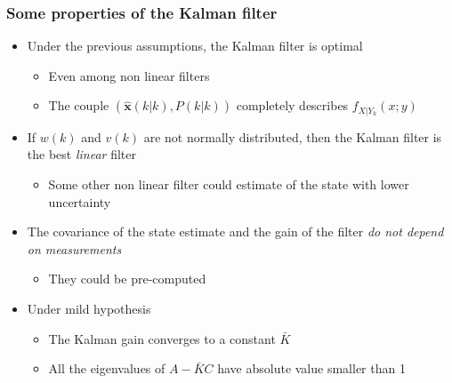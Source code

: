 \begin{frame}
	\frametitle{Some properties of the Kalman filter}
	\begin{itemize}\setlength\itemsep{1em}
		\item Under the previous assumptions, the Kalman filter is optimal
		\begin{itemize}
			\item Even among non linear filters
			\item The couple $(\hat{\bm{x}}(k|k), P(k|k))$ completely describes $f_{X|Y_k}(x;y)$
		\end{itemize}
		\item If $w(k)$ and $v(k)$ are not normally distributed, then the Kalman filter is the best \emph{linear} filter
		\begin{itemize}
			\item Some other non linear filter could estimate of the state with lower uncertainty
		\end{itemize}
		\item The covariance of the state estimate and the gain of the filter \emph{do not depend on measurements}
		\begin{itemize}
			\item They could be pre-computed
		\end{itemize}
		\item Under mild hypothesis
		\begin{itemize}
			\item The Kalman gain converges to a constant $\bar{K}$
			\item All the eigenvalues of $A-\bar{K}C$ have absolute value smaller than 1
		\end{itemize} 
	\end{itemize}
\end{frame}

